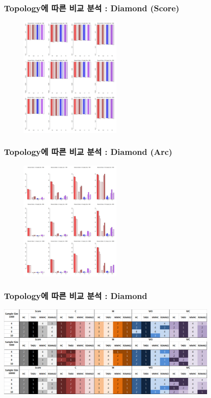\documentclass{beamer}
\begin{document}
\begin{frame}
\frametitle{Topology에 따른 비교 분석 : Diamond (Score)}
{\scriptsize{}
	\begin{figure}
		\includegraphics[height=170pt]{images/05_Diamond_Score}
	\end{figure}	
}
\end{frame}


\begin{frame}
\frametitle{Topology에 따른 비교 분석 : Diamond (Arc)}
{\scriptsize{}
	\begin{figure}
		\includegraphics[height=170pt]{images/05_Diamond_Arcs}
	\end{figure}	
}
\end{frame}


\begin{frame}
\frametitle{Topology에 따른 비교 분석 : Diamond}
{\scriptsize{}
	\begin{center}
		\includegraphics[height=130pt]{images/Result_Diamond}
	\end{center}
}
\end{frame}
\end{document}
